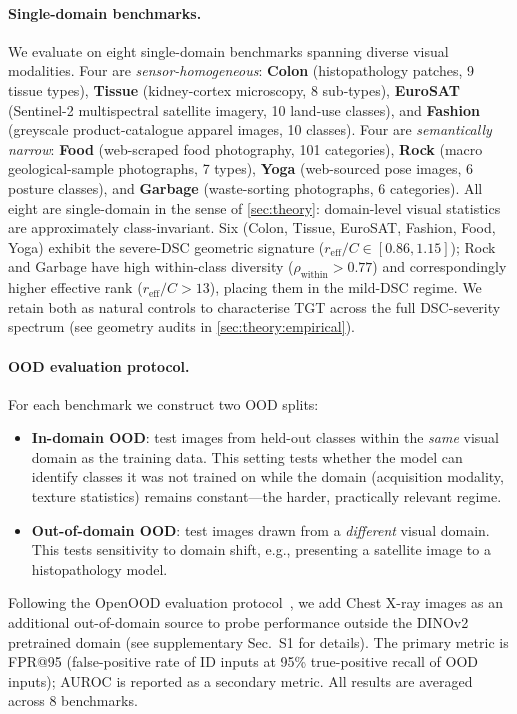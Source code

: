 \documentclass[runningheads]{llncs}
\begin{document}
\paragraph{Single-domain benchmarks.}
We evaluate on eight single-domain benchmarks spanning diverse visual modalities.
Four are \emph{sensor-homogeneous}: \textbf{Colon} (histopathology patches, 9 tissue types), \textbf{Tissue} (kidney-cortex microscopy, 8 sub-types), \textbf{EuroSAT} (Sentinel-2 multispectral satellite imagery, 10 land-use classes), and \textbf{Fashion} (greyscale product-catalogue apparel images, 10 classes).
Four are \emph{semantically narrow}: \textbf{Food} (web-scraped food photography, 101 categories), \textbf{Rock} (macro geological-sample photographs, 7 types), \textbf{Yoga} (web-sourced pose images, 6 posture classes), and \textbf{Garbage} (waste-sorting photographs, 6 categories).
All eight are single-domain in the sense of \cref{sec:theory}: domain-level visual
statistics are approximately class-invariant.
Six (Colon, Tissue, EuroSAT, Fashion, Food, Yoga) exhibit the severe-DSC geometric
signature ($r_{\mathrm{eff}}/C \in [0.86, 1.15]$); Rock and Garbage have high
within-class diversity ($\rho_{\mathrm{within}} > 0.77$) and correspondingly higher
effective rank ($r_{\mathrm{eff}}/C > 13$), placing them in the mild-DSC regime.
We retain both as natural controls to characterise TGT across the full DSC-severity
spectrum (see geometry audits in \cref{sec:theory:empirical}).

\paragraph{OOD evaluation protocol.}
For each benchmark we construct two OOD splits:
\begin{itemize}
  \item \textbf{In-domain OOD}: test images from held-out classes within the \emph{same} visual domain as the training data.
    This setting tests whether the model can identify classes it was not trained on while the domain (acquisition modality, texture statistics) remains constant---the harder, practically relevant regime.
  \item \textbf{Out-of-domain OOD}: test images drawn from a \emph{different} visual domain.
    This tests sensitivity to domain shift, e.g., presenting a satellite image to a histopathology model.
\end{itemize}
Following the OpenOOD evaluation protocol~\cite{Yang2022openood}, we add Chest X-ray images \cite{yang2023medmnist} as an additional out-of-domain source to probe performance outside the DINOv2 pretrained domain (see supplementary Sec.~S1 for details).
The primary metric is FPR@95 (false-positive rate of ID inputs at 95\% true-positive recall of OOD inputs); AUROC is reported as a secondary metric.
All results are averaged across 8 benchmarks.
\end{document}
